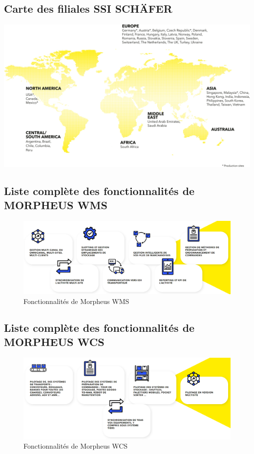 \documentclass[a4paper, 12pt, french]{article}
\begin{document}
		\subsection{Carte des filiales SSI SCHÄFER}\label{appendix:map}
			\begin{center}
				\includegraphics[width=\textwidth]{images/world_map.jpg}
			\end{center}
		\newpage


		\subsection{Liste complète des fonctionnalités de MORPHEUS WMS}\label{appendix:morpheusWMSFonctionnalites}
			\begin{figure}[h!]
					\includegraphics[width=\linewidth]{images/morpheus_wms_fonctionnalites.png}
					\caption{Fonctionnalités de Morpheus WMS}%
					\label{fig:morpheus_wms_fonctionnalites}
			\end{figure}
		\subsection{Liste complète des fonctionnalités de MORPHEUS WCS}\label{appendix:morpheusWCSFonctionnalites}
			\begin{figure}[h!]
					\includegraphics[width=\linewidth]{images/morpheus_wcs_fonctionnalites.png}
					\caption{Fonctionnalités de Morpheus WCS}%
					\label{fig:morpheus_wcs_fonctionnalites}
			\end{figure}
\end{document}
